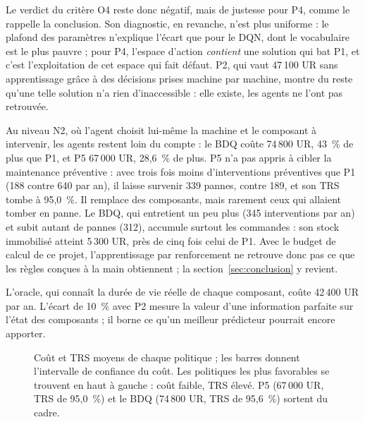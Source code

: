 Le verdict du critère O4 reste donc négatif, mais de justesse pour P4, comme le rappelle la conclusion. Son diagnostic, en revanche, n'est plus uniforme : le plafond des paramètres n'explique l'écart que pour le DQN, dont le vocabulaire est le plus pauvre ; pour P4, l'espace d'action \emph{contient} une solution qui bat P1, et c'est l'exploitation de cet espace qui fait défaut. P2, qui vaut 47\,100 UR sans apprentissage grâce à des décisions prises machine par machine, montre du reste qu'une telle solution n'a rien d'inaccessible : elle existe, les agents ne l'ont pas retrouvée.

Au niveau N2, où l'agent choisit lui-même la machine et le composant à intervenir, les agents restent loin du compte : le BDQ coûte 74\,800 UR, 43~\% de plus que P1, et P5 67\,000 UR, 28,6~\% de plus. P5 n'a pas appris à cibler la maintenance préventive : avec trois fois moins d'interventions préventives que P1 (188 contre 640 par an), il laisse survenir 339 pannes, contre 189, et son TRS tombe à 95,0~\%. Il remplace des composants, mais rarement ceux qui allaient tomber en panne. Le BDQ, qui entretient un peu plus (345 interventions par an) et subit autant de pannes (312), accumule surtout les commandes : son stock immobilisé atteint 5\,300 UR, près de cinq fois celui de P1. Avec le budget de calcul de ce projet, l'apprentissage par renforcement ne retrouve donc pas ce que les règles conçues à la main obtiennent ; la section~\ref{sec:conclusion} y revient.

L'oracle, qui connaît la durée de vie réelle de chaque composant, coûte 42\,400 UR par an. L'écart de 10~\% avec P2 mesure la valeur d'une information parfaite sur l'état des composants ; il borne ce qu'un meilleur prédicteur pourrait encore apporter.

\begin{figure}[H]
\centering
{}
\caption{Coût et TRS moyens de chaque politique ; les barres donnent l'intervalle de confiance du coût. Les politiques les plus favorables se trouvent en haut à gauche : coût faible, TRS élevé. P5 (67\,000 UR, TRS de 95,0~\%) et le BDQ (74\,800 UR, TRS de 95,6~\%) sortent du cadre.}
\label{fig:pareto}
\end{figure}

